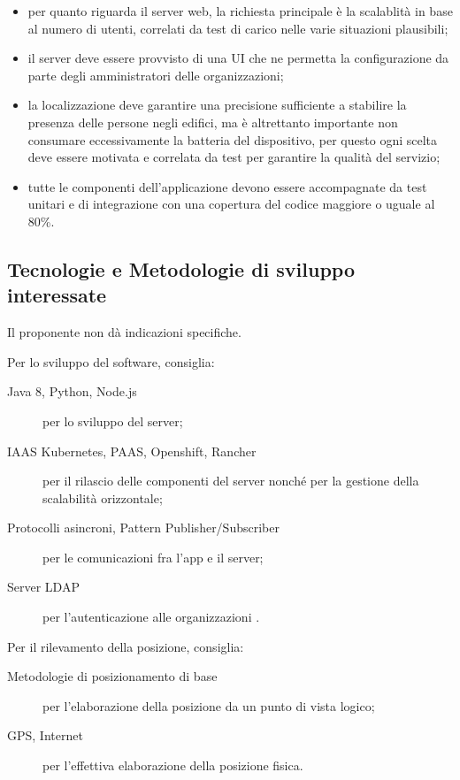 \documentclass[../studio-di-fattibilita.tex]{subfiles}
\begin{document}
\begin{itemize}
		\item per quanto riguarda il server web, la richiesta principale è la scalablità in base al numero di utenti, correlati da test di carico nelle varie situazioni plausibili;
		\item il server deve essere provvisto di una UI che ne permetta la configurazione da parte degli amministratori delle organizzazioni;
		\item la localizzazione deve garantire una precisione sufficiente a stabilire la presenza delle persone negli edifici, ma è altrettanto importante non consumare eccessivamente la batteria del dispositivo, per questo ogni scelta deve essere motivata e correlata da test per garantire la qualità del servizio;
		\item tutte le componenti dell’applicazione devono essere accompagnate da test unitari e di integrazione con una copertura del codice maggiore o uguale al 80\%. 
	\end{itemize}

	
	\subsection{Tecnologie e Metodologie di sviluppo interessate}
	\label{subsec:tecnologie_interessate}
	Il proponente non dà indicazioni specifiche.

	Per lo sviluppo del software, consiglia:
	\begin{description}
		\item[Java 8, Python, Node.js] per lo sviluppo del server;
		\item[IAAS Kubernetes, PAAS, Openshift, Rancher] per il rilascio delle componenti del server nonché per la gestione della scalabilità orizzontale;
		\item[Protocolli asincroni, Pattern Publisher/Subscriber] per le comunicazioni fra l'app e il server;
		\item[Server LDAP] per l'autenticazione alle organizzazioni .
	\end{description}

	Per il rilevamento della posizione, consiglia:
	\begin{description}
		\item[Metodologie di posizionamento di base] per l'elaborazione della posizione da un punto di vista logico;
		\item[GPS, Internet] per l'effettiva elaborazione della posizione fisica.
	\end{description}
\end{document}
